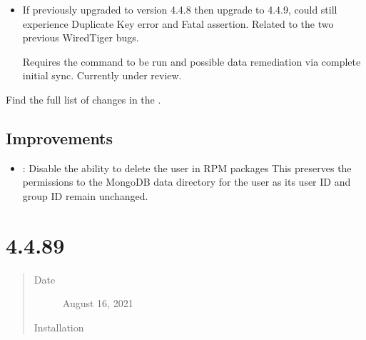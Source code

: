 \documentclass[letterpaper,10pt,english]{sphinxmanual}
\begin{document}
\begin{itemize}
\item {} 
\sphinxAtStartPar
{} \sphinxhyphen{} If previously upgraded to version 4.4.8 then upgrade to 4.4.9, could still experience Duplicate Key error and Fatal assertion. Related to the two previous WiredTiger bugs.

\sphinxAtStartPar
Requires the   command to be run and possible data remediation via complete initial sync. Currently under review.

\end{itemize}

\sphinxAtStartPar
Find the full list of changes in the .


\subsection{Improvements}
\label{\detokenize{release_notes/4.4.9-10:improvements}}\begin{itemize}
\item {} 
\sphinxAtStartPar
{}: Disable the ability to delete the  user in RPM packages \sphinxhyphen{} This preserves the permissions to the MongoDB data directory for the  user as its user ID and group ID remain unchanged.

\end{itemize}


\section{ 4.4.8\sphinxhyphen{}9}
\label{\detokenize{release_notes/4.4.8-9:percona-server-for-mongodb-4-4-8-9}}\label{\detokenize{release_notes/4.4.8-9:psmdb-4-4-8-9}}\label{\detokenize{release_notes/4.4.8-9::doc}}\begin{quote}\begin{description}
\item[{Date}] \leavevmode
\sphinxAtStartPar
August 16, 2021

\item[{Installation}] \leavevmode
\sphinxAtStartPar
{}

\end{description}\end{quote}
\end{document}
